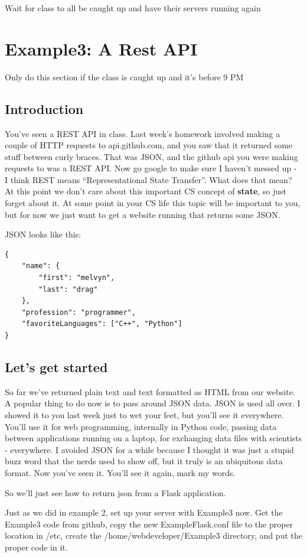 \documentclass[10pt]{article}
\begin{document}
{\LARGE Wait for class to all be caught up and have their servers running again}

\section{Example3: A Rest API}
{\LARGE Only do this section if the class is caught up and it's before 9 PM}
\subsection{Introduction}
You've seen a REST API in class. Last week's homework involved making a couple
of HTTP requests to api.github.com, and you saw that it returned some stuff
between curly braces. That was JSON, and the github api you were making requests
to was a REST API. Now go google to make sure I haven't messed up - I think REST
means ``Representational State Transfer''. What does that mean? At this point we
don't care about this important CS concept of \textbf{state}, so just forget
about it. At some point in your CS life this topic will be important to you, but
for now we just want to get a website running that returns some JSON. 

JSON looks like this:

\begin{verbatim}
{
	"name": {
		"first": "melvyn",
		"last": "drag"
	},
	"profession": "programmer",
	"favoriteLanguages": ["C++", "Python"]
}
\end{verbatim}


\subsection{Let's get started}
So far we've returned plain text and text formatted as HTML from our website. A popular thing to do now is to pass around JSON data. JSON is used all over. I showed it to you last week just to wet your feet, but you'll see it everywhere. You'll use it for web programming, internally in Python code, passing data between applications running on a laptop, for exchanging data files with scientists - everywhere. I avoided JSON for a while because I thought it was just a stupid buzz word that the nerds used to show off, but it truly is an ubiquitous data format. Now you've seen it. You'll see it again, mark my words. 

So we'll just see how to return json from a Flask application.

Just as we did in example 2, set up your server with Example3 now. Get the Example3 code from github, copy the new ExampleFlask.conf file to the proper location in /etc, create the /home/webdeveloper/Example3 directory, and put the proper code in it. 
\end{document}
